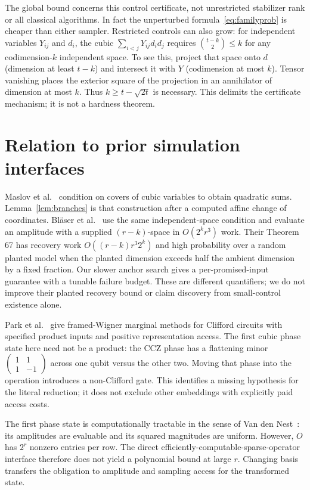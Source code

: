 \documentclass[11pt]{article}
\begin{document}
The global bound concerns this control certificate, not unrestricted stabilizer rank
or all classical algorithms. In fact the unperturbed formula~\eqref{eq:familyprob}
is cheaper than either sampler. Restricted controls can also grow: for independent
variables $Y_{ij}$ and $d_i$, the cubic $\sum_{i<j}Y_{ij}d_id_j$ requires
$\binom{t-k}{2}\leq k$ for any codimension-$k$ independent space. To see this,
project that space onto $d$ (dimension at least $t-k$) and intersect it with $Y$
(codimension at most $k$). Tensor vanishing places the exterior square of the
projection in an annihilator of dimension at most $k$. Thus $k\geq t-\sqrt{2t}$
is necessary. This delimits the certificate mechanism; it is not a hardness theorem.

\section{Relation to prior simulation interfaces}\label{sec:comparison}
Maslov et al.~\cite[Section II]{maslov2024} condition on covers of cubic variables
to obtain quadratic sums. Lemma~\ref{lem:branches} is that construction after a
computed affine change of coordinates. Bl\"aser et al.~\cite[Definition 1 and
Theorem 41]{blaser2026} use the same independent-space condition and evaluate an
amplitude with a supplied $(r-k)$-space in $O(2^kr^3)$ work. Their Theorem 67 has
recovery work $O((r-k)r^3 2^k)$ and high probability over a random planted model
when the planted dimension exceeds half the ambient dimension by a fixed fraction.
Our slower anchor search gives a per-promised-input guarantee with a tunable
failure budget. These are different quantifiers; we do not improve their planted
recovery bound or claim discovery from small-control existence alone.

Park et al.~\cite[Supplement, Section IV.3, Theorem 4]{park2024} give framed-Wigner
marginal methods for Clifford circuits with specified product inputs and positive
representation access. The first cubic phase state here need not be a product: the
CCZ phase has a flattening minor $\left(\begin{smallmatrix}1&1\\1&-1\end{smallmatrix}\right)$
across one qubit versus the other two. Moving that phase into the operation introduces
a non-Clifford gate. This identifies a missing hypothesis for the literal reduction;
it does not exclude other embeddings with explicitly paid access costs.

The first phase state is computationally tractable in the sense of
Van den Nest~\cite[Sections 4.1 and 4.3]{nest2011}: its amplitudes are evaluable and
its squared magnitudes are uniform. However, $O$ has $2^r$ nonzero entries per row.
The direct efficiently-computable-sparse-operator interface therefore does not yield
a polynomial bound at large $r$. Changing basis transfers the obligation to amplitude
and sampling access for the transformed state.
\end{document}
